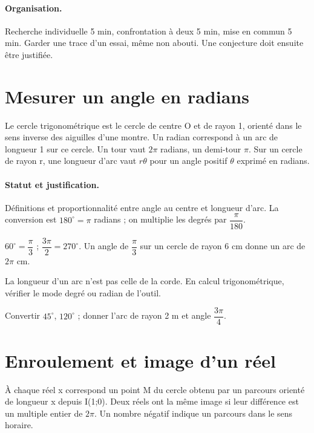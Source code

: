 \paragraph{Organisation.} Recherche individuelle 5 min, confrontation à deux 5 min, mise en commun 5 min. Garder une trace d’un essai, même non abouti. Une conjecture doit ensuite être justifiée.
\mxnewpage
\section{Mesurer un angle en radians}\label{C10-U1}
\begin{keypoint}
Le cercle trigonométrique est le cercle de centre O et de rayon 1, orienté dans le sens inverse des aiguilles d’une montre. Un radian correspond à un arc de longueur 1 sur ce cercle. Un tour vaut $2\pi$ radians, un demi-tour $\pi$. Sur un cercle de rayon r, une longueur d’arc vaut $r\theta$ pour un angle positif $\theta$ exprimé en radians.
\end{keypoint}
\paragraph{Statut et justification.} Définitions et proportionnalité entre angle au centre et longueur d’arc. La conversion est $180^\circ=\pi$ radians ; on multiplie les degrés par $\dfrac{\pi}{180}$.
\begin{example}$60^\circ =\dfrac{\pi}{3}$ ; $\dfrac{3\pi}{2}=270^\circ $. Un angle de $\dfrac{\pi}{3}$ sur un cercle de rayon 6 cm donne un arc de $2\pi$ cm.\end{example}\label{C10-EX1}
\begin{pitfall}La longueur d’un arc n’est pas celle de la corde. En calcul trigonométrique, vérifier le mode degré ou radian de l’outil.\end{pitfall}
\begin{application}Convertir $45^\circ$, $120^\circ$ ; donner l’arc de rayon 2 m et angle $\dfrac{3\pi}{4}$.\end{application}\label{C10-AP1}
\section{Enroulement et image d’un réel}\label{C10-U2}
\begin{keypoint}
À chaque réel x correspond un point M du cercle obtenu par un parcours orienté de longueur x depuis I(1;0). Deux réels ont la même image si leur différence est un multiple entier de $2\pi$. Un nombre négatif indique un parcours dans le sens horaire.
\end{keypoint}
